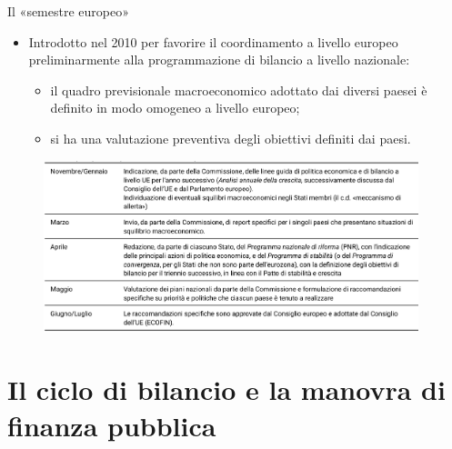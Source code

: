 \documentclass[aspectratio=149,11pt,italian]{beamer}
\begin{document}
\begin{frame}{Il «semestre europeo»}

  \begin{itemize}
  \item Introdotto nel 2010 per favorire il coordinamento a livello europeo
    preliminarmente alla programmazione di bilancio a livello nazionale:
    \begin{itemize}
    \item il quadro previsionale macroeconomico adottato dai diversi paesei è
      definito in modo omogeneo a livello europeo;
    \item si ha una valutazione preventiva degli obiettivi definiti dai paesi.
    \end{itemize}
  \end{itemize}

  \begin{figure}[htbp]
    \centering
    \includegraphics[height=5cm]{./figure/semestre-europeo.png}
  \end{figure}
\end{frame}


\section{Il ciclo di bilancio e la manovra di finanza pubblica}
\end{document}
